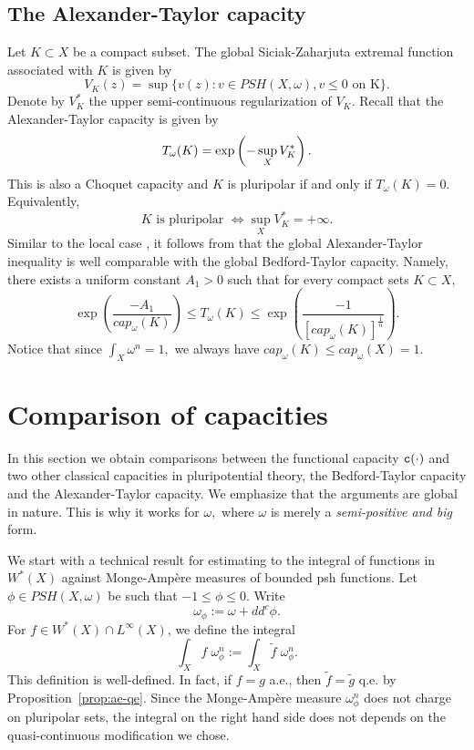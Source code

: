 \documentclass{amsart}
\newcommand{\wt}[1]{\widetilde{#1}}
\newcommand{\om}{\omega}
\newcommand{\tc}{{\tt c}}
\theoremstyle{definition}
\numberwithin{thm}{section}
\numberwithin{equation}{section}
\renewcommand{\[}{\begin{equation}}
\renewcommand{\]}{\end{equation}}
\begin{document}
\subsection{The Alexander-Taylor capacity} Let $K\subset X$ be a compact subset. The global Siciak-Zaharjuta extremal function associated with $K$ is given by 
\[\label{eq:SZ}
	V_K(z) = \sup\{v(z): v\in PSH(X,\om), v\leq 0 \text{ on K}\}.
\]
Denote by $V_K^*$  the upper semi-continuous regularization of $V_K$. Recall that the Alexander-Taylor capacity is given by 
\[\notag\label{eq:AT-cap}
	T_\om (K) = \exp \left( - \sup_X V_K^* \right).
\]
This is also a Choquet capacity and $K$ is pluripolar if and only if $T_\om(K) =0$. Equivalently, 
\[ \label{eq:SZ-polar} K \text{ is pluripolar } \Leftrightarrow 
\sup_X V_K^* =+\infty.
\] 
Similar to the local case \cite{AT84}, it follows from \cite[Lemma~12.2, Lemma~12.3]{GZ-book} that the global Alexander-Taylor inequality is well comparable with the global Bedford-Taylor capacity. Namely, there exists a uniform constant $A_1>0$ such that for every compact sets $K \subset X$,
\[\label{eq:global-AT}
\exp\left(\frac{- A_1}{cap_\om(K)} \right)	\leq T_\om(K) \leq  \exp\left( \frac{-1}{ [cap_\om(K)]^\frac{1}{n}} \right).
\]
Notice that since  $\int_X \om^n =1,$ we always have $cap_\om(K) \leq cap_\om(X) = 1$.

\section{Comparison of capacities}
\label{sec:comparisons}

In this section we obtain comparisons between the functional capacity $\tc(\cdot)$ and two other classical capacities in pluripotential theory, the Bedford-Taylor capacity and  the Alexander-Taylor capacity. We emphasize that the arguments are global in nature. This is why  it works for $\om,$ where $\om$ is merely a {\em semi-positive and  big} form.

We start with  a technical result for estimating to the integral of functions in $W^*(X)$ against Monge-Amp\`ere measures of bounded psh functions. 
Let $\phi \in PSH(X,\om)$ be such that $-1\leq \phi \leq 0$. Write 
$$	
	\om_\phi := \om + dd^c\phi.
$$For $f \in W^*(X) \cap L^\infty(X)$, we define the integral 
\[\label{eq:defn-int}
\int_X f \; \om_\phi^n := \int_X \wt f \; \om_\phi^n.
\]
This definition is well-defined. In fact, 
if $f=g$ a.e., then $\wt f = \wt g$ q.e.  by Proposition~\ref{prop:ae-qe}. Since the Monge-Amp\`ere measure $\om_\phi^n$ does not charge on pluripolar sets,  the integral  on the right hand side does not depends on the quasi-continuous modification we chose. 
\end{document}
